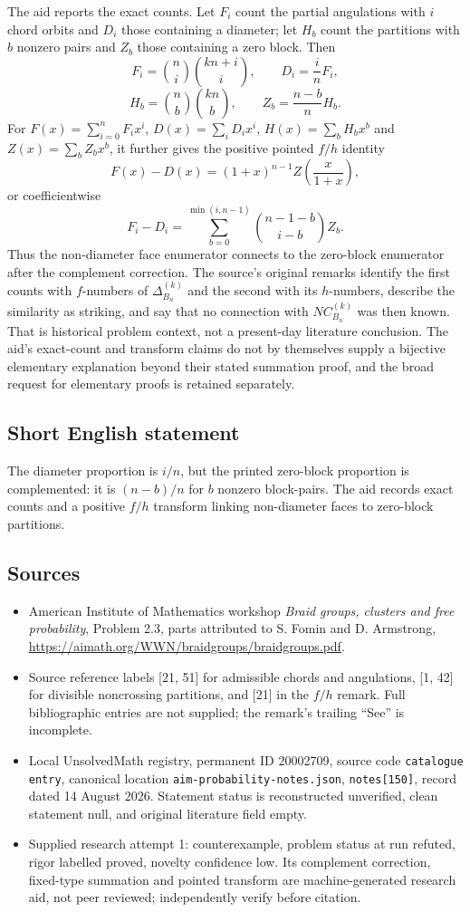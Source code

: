 \documentclass[11pt]{article}
\begin{document}
The aid reports the exact counts. Let $F_i$ count the partial angulations with $i$ chord orbits and $D_i$ those containing a diameter; let $H_b$ count the partitions with $b$ nonzero pairs and $Z_b$ those containing a zero block. Then
\[
 F_i=\binom ni\binom{kn+i}i,\qquad D_i=\frac inF_i,
\]
\[
 H_b=\binom nb\binom{kn}b,\qquad Z_b=\frac{n-b}{n}H_b.
\]
For $F(x)=\sum_{i=0}^nF_ix^i$, $D(x)=\sum_iD_ix^i$, $H(x)=\sum_bH_bx^b$ and $Z(x)=\sum_bZ_bx^b$, it further gives the positive pointed $f/h$ identity
\[
 F(x)-D(x)=(1+x)^{n-1}Z\left(\frac{x}{1+x}\right),
\]
or coefficientwise
\[
 F_i-D_i=\sum_{b=0}^{\min(i,n-1)}
               \binom{n-1-b}{i-b}Z_b.
\]
Thus the non-diameter face enumerator connects to the zero-block enumerator after the complement correction. The source's original remarks identify the first counts with $f$-numbers of $\Delta^{(k)}_{B_n}$ and the second with its $h$-numbers, describe the similarity as striking, and say that no connection with $NC^{(k)}_{B_n}$ was then known. That is historical problem context, not a present-day literature conclusion. The aid's exact-count and transform claims do not by themselves supply a bijective elementary explanation beyond their stated summation proof, and the broad request for elementary proofs is retained separately.
\subsection{Short English statement}
The diameter proportion is $i/n$, but the printed zero-block proportion is complemented: it is $(n-b)/n$ for $b$ nonzero block-pairs. The aid records exact counts and a positive $f/h$ transform linking non-diameter faces to zero-block partitions.
\subsection{Sources}
\begin{itemize}
\item American Institute of Mathematics workshop \emph{Braid groups, clusters and free probability}, Problem 2.3, parts attributed to S. Fomin and D. Armstrong, \url{https://aimath.org/WWN/braidgroups/braidgroups.pdf}.
\item Source reference labels [21, 51] for admissible chords and angulations, [1, 42] for divisible noncrossing partitions, and [21] in the $f/h$ remark. Full bibliographic entries are not supplied; the remark's trailing ``See'' is incomplete.
\item Local UnsolvedMath registry, permanent ID 20002709, source code \texttt{catalogue entry}, canonical location \texttt{aim-probability-notes.json}, \texttt{notes[150]}, record dated 14 August 2026. Statement status is reconstructed unverified, clean statement null, and original literature field empty.
\item Supplied research attempt 1: counterexample, problem status at run refuted, rigor labelled proved, novelty confidence low. Its complement correction, fixed-type summation and pointed transform are machine-generated research aid, not peer reviewed; independently verify before citation.
\end{itemize}
\end{document}
